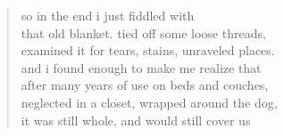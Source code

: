 \begin{verse}
so in the end i just fiddled with  \\
that old blanket. tied off some loose threads, \\
examined it for tears, stains, unraveled places. \\
and i found enough to make me realize that \\
after many years of use on beds and couches, \\
neglected in a closet, wrapped around the dog, \\
it was still whole, and would still cover us
\end{verse}
